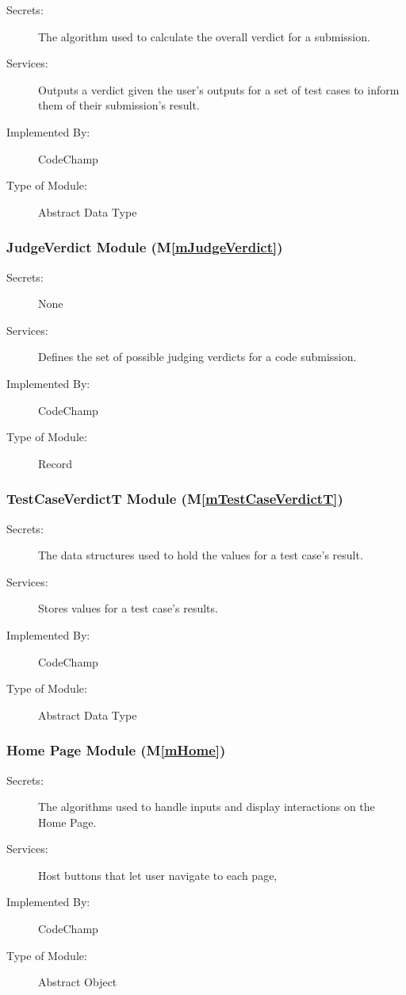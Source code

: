 \documentclass[12pt, titlepage]{article}
\newcommand{\mref}[1]{M\ref{#1}}
\begin{document}
\begin{description}
\item[Secrets:] The algorithm used to calculate the overall verdict for a submission.
\item[Services:] Outputs a verdict given the user's outputs for a set of test cases to inform them of their submission's result.
\item[Implemented By:] CodeChamp
\item[Type of Module:] Abstract Data Type
\end{description}

\subsubsection{ JudgeVerdict Module (\mref{mJudgeVerdict})}

\begin{description}
\item[Secrets:] None
\item[Services:] Defines the set of possible judging verdicts for a code submission.
\item[Implemented By:] CodeChamp
\item[Type of Module:] Record
\end{description}

\subsubsection{ TestCaseVerdictT Module (\mref{mTestCaseVerdictT})}

\begin{description}
\item[Secrets:] The data structures used to hold the values for a test case's result.
\item[Services:] Stores values for a test case's results.
\item[Implemented By:] CodeChamp
\item[Type of Module:] Abstract Data Type
\end{description}

\subsubsection{ Home Page Module (\mref{mHome})}

\begin{description}
\item[Secrets:] The algorithms used to handle inputs and display interactions on the Home Page.
\item[Services:] Host buttons that let user navigate to each page,
\item[Implemented By:] CodeChamp
\item[Type of Module:] Abstract Object
\end{description}
\end{document}
